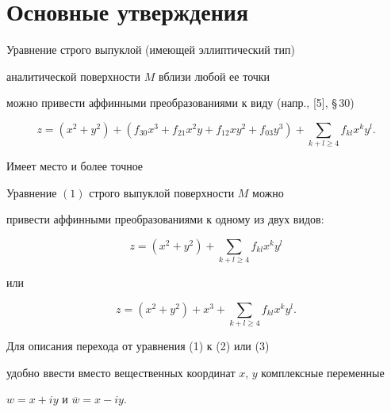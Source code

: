 \section{Основные утверждения}





Уравнение строго выпуклой (имеющей эллиптический тип)


аналитической поверхности $ M $ вблизи любой ее точки


можно привести аффинными преобразованиями к виду (напр., [5], \S\,30)


\begin{equation}


z=(x^2+y^2)+(f_{30} x^3+f_{21} x^2y+f_{12} x y^2+


f_{03} y^3)+\sum_{k+l \ge 4} f_{kl} x^k y^l .


\end{equation}





Имеет место и более точное





\begin{prop}


Уравнение $(1)$ строго выпуклой поверхности $M$ можно


привести аффинными преобразованиями к одному из двух видов$:$


\begin{equation}


z=(x^2+y^2)+ \sum_{k+l \ge 4} f_{kl} x^k y^l


\end{equation}


или


\begin{equation}


z=(x^2+y^2)+x^3+\sum_{k+l \ge 4} f_{kl} x^k y^l .


\end{equation}


\end{prop}





Для описания перехода от уравнения (1) к (2) или (3)


удобно ввести вместо вещественных координат $x$, $y$ комплексные переменные


$w=x+i y$ и $\overline w=x - i y$.





